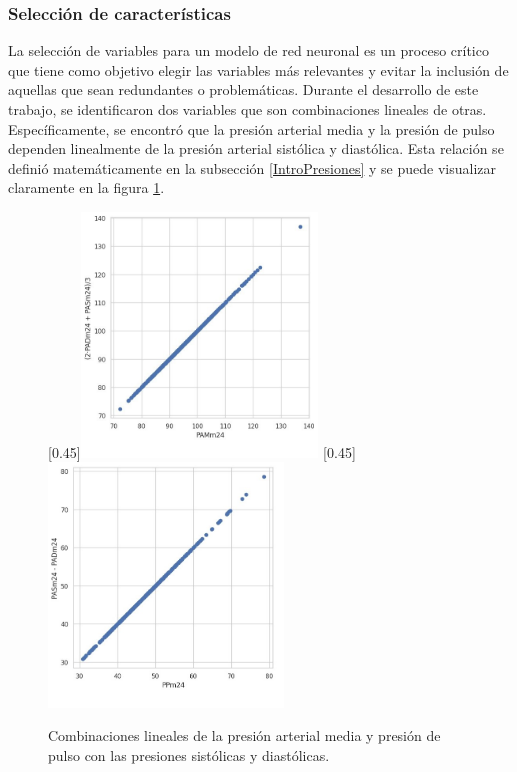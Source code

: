 \subsubsection{Selección de características}

La selección de variables para un modelo de red neuronal es un proceso crítico que tiene como objetivo 
elegir las variables más relevantes y evitar la inclusión de aquellas que sean redundantes o 
problemáticas. Durante el desarrollo de este trabajo, se identificaron dos variables que son 
combinaciones lineales de otras. Específicamente, se encontró que la presión arterial media y 
la presión de pulso dependen linealmente de la presión arterial sistólica y diastólica. 
Esta relación se definió matemáticamente en la subsección \ref{IntroPresiones} y 
se puede visualizar claramente en la figura \ref{fig:pamypp}. 

\begin{figure}[H]
	\centering
	\hspace{1em}
	[0.45\linewidth]{\includegraphics[height=6.5cm]{./Figures/PAM.jpg}}
	\hspace{1em}
	[0.45\linewidth]{\includegraphics[height=6.5cm]{./Figures/PP.jpg}}
	\caption{Combinaciones lineales de la presión arterial media y presión de pulso con las presiones sistólicas y diastólicas.}\label{fig:pamypp}
\end{figure}



